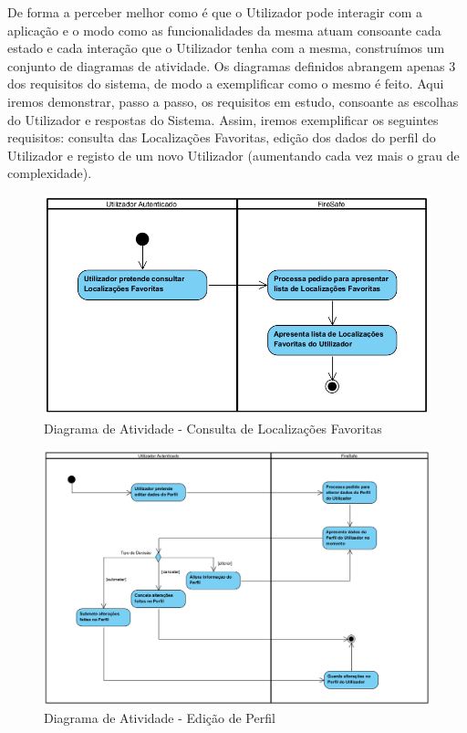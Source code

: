 \documentclass[a4paper,12pt]{scrreprt}
\newcommand{\tab}{
    \hspace{1cm}}
\begin{document}
\tab De forma a perceber melhor como é que o Utilizador pode interagir com a aplicação e o modo como as funcionalidades da mesma atuam consoante cada estado e cada interação que o Utilizador tenha com a mesma, construímos um conjunto de diagramas de atividade. Os diagramas definidos abrangem apenas 3 dos requisitos do sistema, de modo a exemplificar como o mesmo é feito. Aqui iremos demonstrar, passo a passo, os requisitos em estudo, consoante as escolhas do Utilizador e respostas do Sistema. Assim, iremos exemplificar os seguintes requisitos: consulta das Localizações Favoritas, edição dos dados do perfil do Utilizador e registo de um novo Utilizador (aumentando cada vez mais o grau de complexidade).

\vspace{1.5cm}

\begin{figure}[H]
    \centering
    \includegraphics[width=1\textwidth]{images/Fase2/06.DiagramasDeAtividade/1.atividadeConsultarLocalizacoes.png}
    \caption{Diagrama de Atividade - Consulta de Localizações Favoritas}
\end{figure}

\begin{figure}[H]
    \centering
    \includegraphics[width=.9\textwidth]{images/Fase2/06.DiagramasDeAtividade/2.atividadeEditaPerfil.png}
    \caption{Diagrama de Atividade - Edição de Perfil}
\end{figure}
\end{document}
